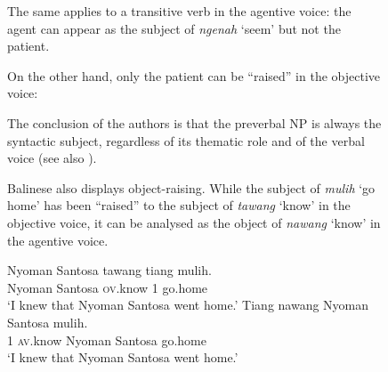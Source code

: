 \documentclass[output=paper
                ,modfonts
                ,nonflat
	        ,collection
	        ,collectionchapter
	        ,collectiontoclongg
 	        ,biblatex
                ,babelshorthands
                ,newtxmath
                ,draftmode
                ,colorlinks, citecolor=brown
]{./langsci/langscibook}
\begin{document}
\begin{figure}
The same applies to a transitive verb in the agentive voice: the agent can appear as the subject of \emph{ngenah} `seem' but not the patient.

\eal
{}
\zl

On the other hand, only the patient can be ``raised'' in the objective voice:

\eal
{}
\zl

The conclusion of the authors is that the preverbal NP is always the syntactic subject, regardless of its thematic role and of the verbal voice (see also \citealt{ManningandSag1998}).

Balinese also displays object-raising. While the subject of \emph{mulih} `go home' has been ``raised'' to the
subject of \emph{tawang} `know' in the objective voice, it can be analysed as the object of \emph{nawang} `know' in the agentive
voice.

\begin{exe}
\ex \begin{xlist}
\ex 
\gll Nyoman Santosa tawang           tiang  mulih.\\
     Nyoman Santosa \textsc{ov}.know 1      go.home\\\hfill\citep[ex 22]{WechslerandArka1998}
\glt `I knew that Nyoman Santosa went home.'
\ex 
\gll Tiang nawang           Nyoman Santosa mulih.\\
     1     \textsc{av}.know Nyoman Santosa go.home\\
\glt `I knew that Nyoman Santosa went home.'
\end{xlist}
\end{exe}


\end{figure}
\end{document}
